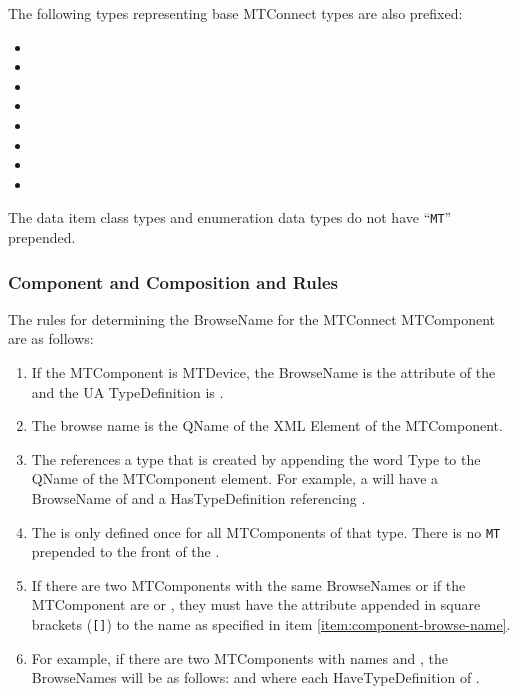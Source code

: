 The following types representing base MTConnect types are also prefixed:

\begin{itemize}
  \setlength\itemsep{0em}
  \item {}
  \item {}
  \item {}
  \item {}
  \item {}
  \item {}
  \item {}
  \item {}
\end{itemize}

The data item class types and enumeration data types do not have ``\texttt{MT}'' prepended.

\subsubsection{Component and Composition  and  Rules} \label{sec:browse-name-rules}

The rules for determining the \gls{BrowseName} for the MTConnect \gls{MTComponent} are as follows:

\begin{enumerate}
  \item If the \gls{MTComponent} is \gls{MTDevice}, the \gls{BrowseName} is the  attribute of the  and the UA \gls{TypeDefinition} is .
  \item The browse name is the \gls{QName} of the XML Element of the \gls{MTComponent}. \label{item:component-browse-name}
  \item The  references a type that is created by appending the word \gls{Type} to the \gls{QName} of the \gls{MTComponent} element. For example, a  will have a \gls{BrowseName} of  and a \gls{HasTypeDefinition} referencing .
  \item The  is only defined once for all \glspl{MTComponent} of that type. There is no \texttt{MT} prepended to the front of the  .
  \item If there are two \glspl{MTComponent} with the same \glspl{BrowseName} or if the \gls{MTComponent} are  or , they must have the  attribute appended in square brackets (\texttt{[]}) to the name as specified in item \ref{item:component-browse-name}. 
  \item For example, if there are two  \glspl{MTComponent} with names  and , the \glspl{BrowseName} will be as follows:  and  where each \gls{HaveTypeDefinition} of .
\end{enumerate}

